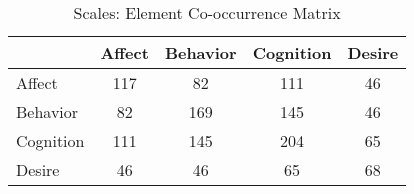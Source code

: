 \begin{table}
\begin{minipage}[t][\textheight][t]{\textwidth}

\caption{\label{tab:ScaleElementCooccurrences}Scales: Element Co-occurrence Matrix}
\begin{tabular}[t]{lcccc}
\toprule
  & Affect & Behavior & Cognition & Desire\\
\midrule
Affect & 117 & 82 & 111 & 46\\
Behavior & 82 & 169 & 145 & 46\\
Cognition & 111 & 145 & 204 & 65\\
Desire & 46 & 46 & 65 & 68\\
\bottomrule
\end{tabular}
\end{minipage}
\end{table}
